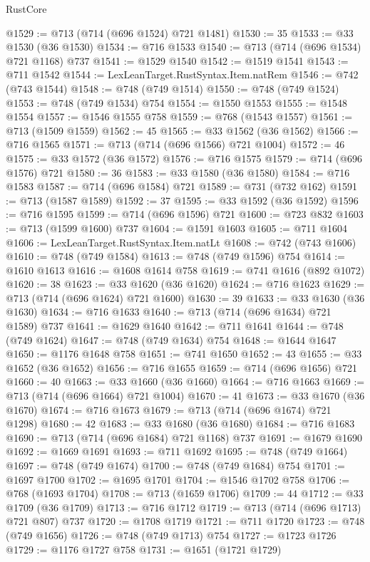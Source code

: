 \begin{lexlean}{RustCore}
\begin{coremodule}
@1529 := @713 (@714 (@696 @1524) @721 @1481)
@1530 := 35
@1533 := @33 @1530 (@36 @1530)
@1534 := @716 @1533
@1540 := @713 (@714 (@696 @1534) @721 @1168) @737
@1541 := @1529 @1540
@1542 := @1519 @1541
@1543 := @711 @1542
@1544 := LexLeanTarget.RustSyntax.Item.natRem
@1546 := @742 (@743 @1544)
@1548 := @748 (@749 @1514)
@1550 := @748 (@749 @1524)
@1553 := @748 (@749 @1534) @754
@1554 := @1550 @1553
@1555 := @1548 @1554
@1557 := @1546 @1555 @758
@1559 := @768 (@1543 @1557)
@1561 := @713 (@1509 @1559)
@1562 := 45
@1565 := @33 @1562 (@36 @1562)
@1566 := @716 @1565
@1571 := @713 (@714 (@696 @1566) @721 @1004)
@1572 := 46
@1575 := @33 @1572 (@36 @1572)
@1576 := @716 @1575
@1579 := @714 (@696 @1576) @721
@1580 := 36
@1583 := @33 @1580 (@36 @1580)
@1584 := @716 @1583
@1587 := @714 (@696 @1584) @721
@1589 := @731 (@732 @162)
@1591 := @713 (@1587 @1589)
@1592 := 37
@1595 := @33 @1592 (@36 @1592)
@1596 := @716 @1595
@1599 := @714 (@696 @1596) @721
@1600 := @723 @832
@1603 := @713 (@1599 @1600) @737
@1604 := @1591 @1603
@1605 := @711 @1604
@1606 := LexLeanTarget.RustSyntax.Item.natLt
@1608 := @742 (@743 @1606)
@1610 := @748 (@749 @1584)
@1613 := @748 (@749 @1596) @754
@1614 := @1610 @1613
@1616 := @1608 @1614 @758
@1619 := @741 @1616 (@892 @1072)
@1620 := 38
@1623 := @33 @1620 (@36 @1620)
@1624 := @716 @1623
@1629 := @713 (@714 (@696 @1624) @721 @1600)
@1630 := 39
@1633 := @33 @1630 (@36 @1630)
@1634 := @716 @1633
@1640 := @713 (@714 (@696 @1634) @721 @1589) @737
@1641 := @1629 @1640
@1642 := @711 @1641
@1644 := @748 (@749 @1624)
@1647 := @748 (@749 @1634) @754
@1648 := @1644 @1647
@1650 := @1176 @1648 @758
@1651 := @741 @1650
@1652 := 43
@1655 := @33 @1652 (@36 @1652)
@1656 := @716 @1655
@1659 := @714 (@696 @1656) @721
@1660 := 40
@1663 := @33 @1660 (@36 @1660)
@1664 := @716 @1663
@1669 := @713 (@714 (@696 @1664) @721 @1004)
@1670 := 41
@1673 := @33 @1670 (@36 @1670)
@1674 := @716 @1673
@1679 := @713 (@714 (@696 @1674) @721 @1298)
@1680 := 42
@1683 := @33 @1680 (@36 @1680)
@1684 := @716 @1683
@1690 := @713 (@714 (@696 @1684) @721 @1168) @737
@1691 := @1679 @1690
@1692 := @1669 @1691
@1693 := @711 @1692
@1695 := @748 (@749 @1664)
@1697 := @748 (@749 @1674)
@1700 := @748 (@749 @1684) @754
@1701 := @1697 @1700
@1702 := @1695 @1701
@1704 := @1546 @1702 @758
@1706 := @768 (@1693 @1704)
@1708 := @713 (@1659 @1706)
@1709 := 44
@1712 := @33 @1709 (@36 @1709)
@1713 := @716 @1712
@1719 := @713 (@714 (@696 @1713) @721 @807) @737
@1720 := @1708 @1719
@1721 := @711 @1720
@1723 := @748 (@749 @1656)
@1726 := @748 (@749 @1713) @754
@1727 := @1723 @1726
@1729 := @1176 @1727 @758
@1731 := @1651 (@1721 @1729)

\end{coremodule}
\end{lexlean}

